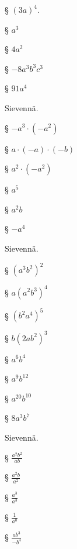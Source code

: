 \begin{tehtavasivu}
\begin{tehtava}
§ $(3a)^4$.

        \begin{vastaus}
           
§ $a^3$ 
           
§ $4a^2$ 
           
§ $-8a^3b^3c^3$ 
           
§ $91a^4$
        \end{vastaus}
    \end{tehtava}
    \begin{tehtava}
        Sievennä. 
       
§ $-a^3\cdot(-a^2)$ 
       
§ $a\cdot(-a)\cdot(-b)$ 
       
§ $a^2\cdot(-a^2)$
        
        \begin{vastaus}
           
§ $a^5$ 
           
§ $a^2b$ 
           
§ $-a^4$
        \end{vastaus}
    \end{tehtava}

    \begin{tehtava}
        Sievennä. 
       
§ $(a^3b^2)^2$ 
       
§ $a(a^2b^3)^4$ 
       
§ $(b^2a^4)^5$ 
       
§ $b(2ab^2)^3$
        
        \begin{vastaus}
           
§ $a^6b^4$ 
           
§ $a^9b^{12}$ 
           
§ $a^{20}b^{10}$ 
           
§ $8a^3b^7$
        \end{vastaus}
    \end{tehtava}
      
    
    \begin{tehtava}
        Sievennä. 
       
§ $\frac{a^2b^2}{ab}$ 
       
§ $\frac{a^2b}{a^2}$ 
       
§ $\frac{a^3}{a^3}$ 
       
§ $\frac{1}{a^0}$ 
       
§ $\frac{ab^3}{-b^4}$
        

\end{tehtava}
\end{tehtavasivu}

